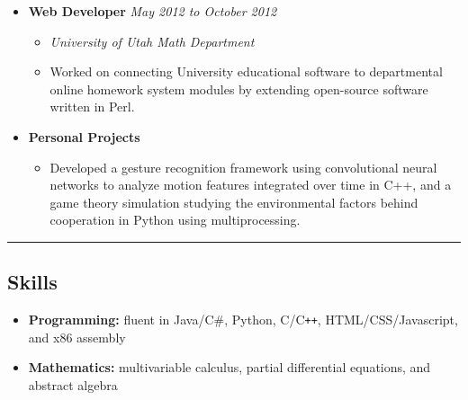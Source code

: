 \documentclass[11pt]{article}
\begin{document}
\begin{itemize}[nolistsep,topsep=0pt, label=]
\item \textbf{Web Developer} \hfill\emph{May 2012 to October 2012}

\begin{itemize}[nolistsep,topsep=0pt, label=]
\item \emph{University of Utah Math Department}
\item Worked on connecting University educational software to departmental online homework system modules by extending open-source software written in Perl.
\end{itemize}

\item \textbf{Personal Projects}

\begin{itemize}[nolistsep,topsep=0pt, label=]
\item Developed a gesture recognition framework using convolutional neural networks to analyze motion features integrated over time in C++, and a game theory simulation studying the environmental factors behind cooperation in Python using multiprocessing. 
\end{itemize}
\end{itemize}
\vspace{0.4em}
\hrule
\vspace{-1em}
\subsection*{\textbf{Skills}}
\begin{itemize}[nolistsep,topsep=0pt, label=]
\itemsep0.33em
\item \textbf{Programming:} fluent in Java/C\#, Python, C/C{}\verb!++!, HTML/CSS/Javascript, and x86 assembly
\item \textbf{Mathematics:} multivariable calculus, partial differential equations,  and abstract algebra
\end{itemize}
\end{document}
